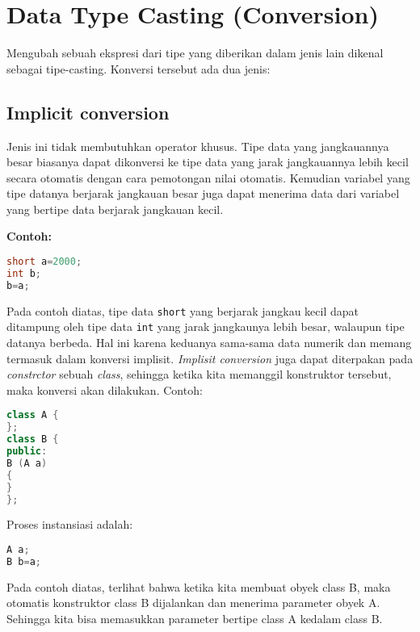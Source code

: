 \section{Data Type Casting
(Conversion)}\label{data-type-casting-conversion}

Mengubah sebuah ekspresi dari tipe yang diberikan dalam jenis lain
dikenal sebagai tipe-casting. Konversi tersebut ada dua jenis:

\subsection{Implicit conversion}\label{implicit-conversion}

Jenis ini tidak membutuhkan operator khusus. Tipe data yang jangkauannya
besar biasanya dapat dikonversi ke tipe data yang jarak jangkauannya
lebih kecil secara otomatis dengan cara pemotongan nilai otomatis.
Kemudian variabel yang tipe datanya berjarak jangkauan besar juga dapat
menerima data dari variabel yang bertipe data berjarak jangkauan kecil.

\textbf{Contoh:}

\begin{lstlisting}[language=c++, numbers=none]
short a=2000;
int b;
b=a;
\end{lstlisting}

Pada contoh diatas, tipe data \texttt{short} yang berjarak jangkau kecil
dapat ditampung oleh tipe data \texttt{int} yang jarak jangkaunya lebih
besar, walaupun tipe datanya berbeda. Hal ini karena keduanya sama-sama
data numerik dan memang termasuk dalam konversi implisit. \emph{Implisit
conversion} juga dapat diterpakan pada \emph{constrctor} sebuah
\emph{class}, sehingga ketika kita memanggil konstruktor tersebut, maka
konversi akan dilakukan. Contoh:

\begin{lstlisting}[language=c++, numbers=none]
class A {
};
class B {
public:
B (A a)
{
}
};
\end{lstlisting}

Proses instansiasi adalah:

\begin{lstlisting}[language=c++, numbers=none]
A a;
B b=a;
\end{lstlisting}

Pada contoh diatas, terlihat bahwa ketika kita membuat obyek class B,
maka otomatis konstruktor class B dijalankan dan menerima parameter
obyek A. Sehingga kita bisa memasukkan parameter bertipe class A kedalam
class B.

